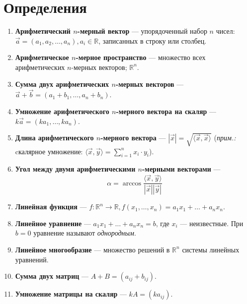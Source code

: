 \documentclass[a4paper, 12pt]{article}
\begin{document}
\section{Определения}
\begin{enumerate}
\item \textbf{Арифметический $n$-мерный вектор} — упорядоченный набор $n$ чисел:\\ $\vec{a} = (a_1, a_2, \ldots, a_n), a_i \in \mathbb{R}$, записанных в строку или столбец.
 
\item \textbf{Арифметическое $n$-мерное пространство} — множество всех арифметических $n$-мерных векторов; $\mathbb{R}^n$.

\item \textbf{Сумма двух арифметических $n$-мерных векторов} — $\vec a + \vec b = (a_1 + b_1, \dots, a_n+b_n)$.

\item \textbf{Умножение арифметического $n$-мерного вектора на скаляр} --- \\$k\vec a = (ka_1, \ldots, ka_n)$.

\item \textbf{Длина арифметического $n$-мерного вектора} — $|\vec x| = \sqrt{\langle \vec{x}, \vec{x} \rangle}$ (\textit{прим.:} cкалярное умножение: $\langle \vec{x}, \vec{y} \rangle = \sum\limits_{i = 1}^{n} x_i\cdot y_i$).

\item \textbf{Угол между двумя арифметическими $n$-мерными векторами} — \[\alpha = \arccos \frac{\langle \vec{x}, \vec{y} \rangle}{|\vec x||\vec y|}\]

\item \textbf{Линейная функция} — $f: \mathbb{R}^n \rightarrow \mathbb{R}, f(x_1, \ldots, x_n) = a_1x_1 + \dots + a_nx_n$.

\item \textbf{Линейное уравнение} — $a_1x_1 + \ldots + a_nx_n = b$, где $x_i$ — неизвестные. При $b = 0$ уравнение называют \textit{однородным}.

\item \textbf{Линейное многообразие} — множество решений в $\mathbb{R}^n$ системы линейных уравнений.

\item \textbf{Сумма двух матриц} — $A + B = (a_{ij} + b_{ij})$.

\item \textbf{Умножение матрицы на скаляр} — $kA = (ka_{ij})$.


\end{enumerate}
\end{document}
